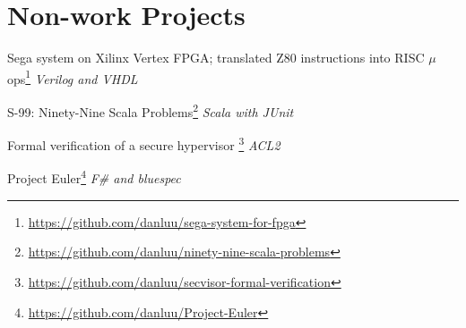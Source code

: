\documentclass[letterpaper]{scrartcl}
\begin{document}
\section*{Non-work Projects}
\begin{list1}
\item
  \begin{list2}
  \item Sega system on Xilinx Vertex FPGA; translated Z80 instructions into RISC $\mu$ops\footnote{\href{https://github.com/danluu/sega-system-for-fpga}{https://github.com/danluu/sega-system-for-fpga}}  \hfill \emph{Verilog and VHDL}
  \item S-99: Ninety-Nine Scala Problems\footnote{\href{https://github.com/danluu/ninety-nine-scala-problems}
    {https://github.com/danluu/ninety-nine-scala-problems}} \hfill \emph{Scala with JUnit}
  \item Formal verification of a secure hypervisor \footnote{\href{https://github.com/danluu/secvisor-formal-verification}{https://github.com/danluu/secvisor-formal-verification}} \hfill \emph{ACL2}
  \item Project Euler\footnote{\href{https://github.com/danluu/Project-Euler}{https://github.com/danluu/Project-Euler}} \hfill \emph{F\# and bluespec}


  \end{list2}
\end{list1}


%
%
\end{document}
